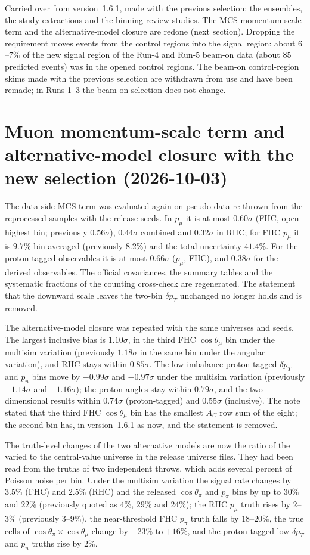 Carried over from version~1.6.1, made with the previous selection: the ensembles, the study extractions and the
binning-review studies. The MCS momentum-scale term and the alternative-model closure are redone (next section).
Dropping the requirement moves events from the control regions into the signal region: about $6$--$7\%$ of the new
signal region of the Run-4 and Run-5 beam-on data (about $85$ predicted events) was in the opened control regions.
The beam-on control-region skims made with the previous selection are withdrawn from use and have been remade; in
Runs 1--3 the beam-on selection does not change.

\section{Muon momentum-scale term and alternative-model closure with the new selection (2026-10-03)}

The data-side MCS term was evaluated again on pseudo-data re-thrown from the reprocessed samples with the release
seeds. In $p_\mu$ it is at most $0.60\sigma$ (FHC, open highest bin; previously $0.56\sigma$), $0.44\sigma$ combined
and $0.32\sigma$ in RHC; for FHC $p_\mu$ it is $9.7\%$ bin-averaged (previously $8.2\%$) and the total uncertainty
$41.4\%$. For the proton-tagged observables it is at most $0.66\sigma$ ($p_\mu$, FHC), and $0.38\sigma$ for the
derived observables. The official covariances, the summary tables and the systematic fractions of the counting
cross-check are regenerated. The statement that the downward scale leaves the two-bin $\delta p_T$ unchanged no
longer holds and is removed.

The alternative-model closure was repeated with the same universes and seeds. The largest inclusive bias is
$1.10\sigma$, in the third FHC $\cos\theta_\mu$ bin under the multisim variation (previously $1.18\sigma$ in the same
bin under the angular variation), and RHC stays within $0.85\sigma$. The low-imbalance proton-tagged $\delta p_T$ and
$p_n$ bins move by $-0.99\sigma$ and $-0.97\sigma$ under the multisim variation (previously $-1.14\sigma$ and
$-1.16\sigma$); the proton angles stay within $0.79\sigma$, and the two-dimensional results within $0.74\sigma$
(proton-tagged) and $0.55\sigma$ (inclusive). The note stated that the third FHC $\cos\theta_\mu$ bin has the
smallest $A_C$ row sum of the eight; the second bin has, in version~1.6.1 as now, and the statement is removed.

The truth-level changes of the two alternative models are now the ratio of the varied to the central-value
universe in the release universe files. They had been read from the truths of two independent throws, which adds
several percent of Poisson noise per bin. Under the multisim variation the signal rate changes by $3.5\%$ (FHC)
and $2.5\%$ (RHC) and the released $\cos\theta_\pi$ and $p_\pi$ bins by up to $30\%$ and $22\%$ (previously quoted as
$4\%$, $29\%$ and $24\%$); the RHC $p_\mu$ truth rises by $2$--$3\%$ (previously $3$--$9\%$), the near-threshold
FHC $p_\pi$ truth falls by $18$--$20\%$, the true cells of $\cos\theta_\pi\times\cos\theta_\mu$ change by $-23\%$ to
$+16\%$, and the proton-tagged low $\delta p_T$ and $p_n$ truths rise by $2\%$.

